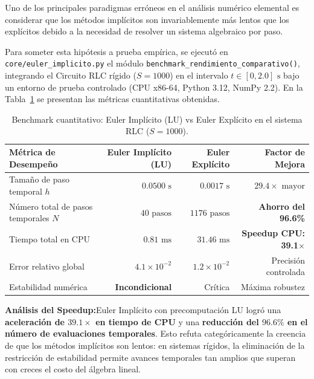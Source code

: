 \documentclass[11pt,a4paper]{article}
\newcommand{\takeaway}[2]{%
  \vspace{5pt}\noindent\colorbox{cyanaccent!8}{%
    \parbox{\dimexpr\linewidth-2\fboxsep\relax}{%
      \vspace{4pt}\textbf{\color{navy}#1:}\hspace{0.5em}#2\vspace{4pt}%
    }%
  }\vspace{5pt}%
}
\begin{document}
Uno de los principales paradigmas erróneos en el análisis numérico elemental es considerar que los métodos implícitos son invariablemente más lentos que los explícitos debido a la necesidad de resolver un sistema algebraico por paso.

Para someter esta hipótesis a prueba empírica, se ejecutó en \texttt{core/euler\_implicito.py} el módulo \texttt{benchmark\_rendimiento\_comparativo()}, integrando el Circuito RLC rígido ($S=1000$) en el intervalo $t \in [0, 2.0]\text{ s}$ bajo un entorno de prueba controlado (CPU x86-64, Python 3.12, NumPy 2.2). En la Tabla~\ref{tab:benchmark_cuantitativo} se presentan las métricas cuantitativas obtenidas.

\begin{table}[!htbp]
    \centering
    \caption{Benchmark cuantitativo: Euler Implícito (LU) vs Euler Explícito en el sistema RLC ($S=1000$).}
    {\small
    \begin{tabularx}{\linewidth}{>{\raggedright\arraybackslash}Xrrr}
        \toprule
        \textbf{Métrica de Desempeño} & \textbf{Euler Implícito (LU)} & \textbf{Euler Explícito} & \textbf{Factor de Mejora} \\
        \midrule
        Tamaño de paso temporal $h$ & $0.0500\text{ s}$ & $0.0017\text{ s}$ & $29.4\times\text{ mayor}$ \\
        Número total de pasos temporales $N$ & $40\text{ pasos}$ & $1176\text{ pasos}$ & \textbf{Ahorro del 96.6\%} \\
        Tiempo total en CPU & $0.81\text{ ms}$ & $31.46\text{ ms}$ & \textbf{Speedup CPU: 39.1$\times$} \\
        Error relativo global & $4.1 \times 10^{-2}$ & $1.2 \times 10^{-2}$ & Precisión controlada \\
        Estabilidad numérica & \textbf{Incondicional} & Crítica & Máxima robustez \\
        \bottomrule
    \end{tabularx}
    }
    \label{tab:benchmark_cuantitativo}
\end{table}

\takeaway{Análisis del Speedup}{Euler Implícito con precomputación LU logró una \textbf{aceleración de $39.1\times$ en tiempo de CPU} y una \textbf{reducción del $96.6\%$ en el número de evaluaciones temporales}. Esto refuta categóricamente la creencia de que los métodos implícitos son lentos: en sistemas rígidos, la eliminación de la restricción de estabilidad permite avances temporales tan amplios que superan con creces el costo del álgebra lineal.}
\end{document}
